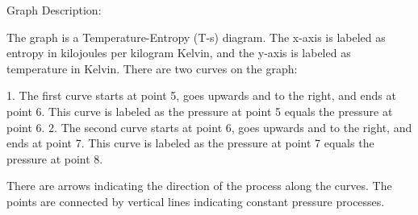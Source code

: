 Graph Description:

The graph is a Temperature-Entropy (T-s) diagram. The x-axis is labeled as entropy in kilojoules per kilogram Kelvin, and the y-axis is labeled as temperature in Kelvin. There are two curves on the graph:

1. The first curve starts at point 5, goes upwards and to the right, and ends at point 6. This curve is labeled as the pressure at point 5 equals the pressure at point 6.
2. The second curve starts at point 6, goes upwards and to the right, and ends at point 7. This curve is labeled as the pressure at point 7 equals the pressure at point 8.

There are arrows indicating the direction of the process along the curves. The points are connected by vertical lines indicating constant pressure processes.